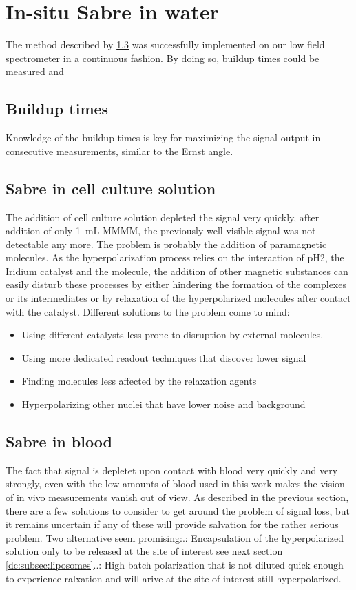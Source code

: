     \section{In-situ Sabre in water}
            The method described by \ref{} was successfully implemented on our low field spectrometer in a continuous fashion. By doing so, buildup times could be measured and
        \subsection{Buildup times}
            Knowledge of the buildup times is key for maximizing the signal output in consecutive measurements, similar to the Ernst angle.
        \subsection{Sabre in cell culture solution}
            The addition of cell culture solution depleted the signal very quickly, after addition of only \SI{1}{\milli\liter} MMMM, the previously well visible signal was not detectable any more. The problem is probably the addition of paramagnetic molecules. As the hyperpolarization process relies on the interaction of pH2, the Iridium catalyst and the molecule, the addition of other magnetic substances can easily disturb these processes by either hindering the formation of the complexes or its intermediates or by relaxation of the hyperpolarized molecules after contact with the catalyst. Different solutions to the problem come to mind: 
            \begin{itemize}
            \setlength{\itemsep}{-7pt}
                \item Using different catalysts less prone to disruption by external molecules.
                \item Using more dedicated readout techniques that discover lower signal
                \item Finding molecules less affected by the relaxation agents
                \item Hyperpolarizing other nuclei that have lower noise and background
            \end{itemize}
        \subsection{Sabre in blood}
        The fact that signal is depletet upon contact with blood very quickly and very strongly, even with the low amounts of blood used in this work makes the vision of in vivo measurements vanish out of view. As described in the previous section, there are a few solutions to consider to get around the problem of signal loss, but it remains uncertain if any of these will provide salvation for the rather serious problem. Two alternative seem promising:.: Encapsulation of the hyperpolarized solution only to be released at the site of interest see next section \ref{dc:subsec:liposomes}..: High batch polarization that is not diluted quick enough to experience ralxation and will arive at the site of interest still hyperpolarized.
